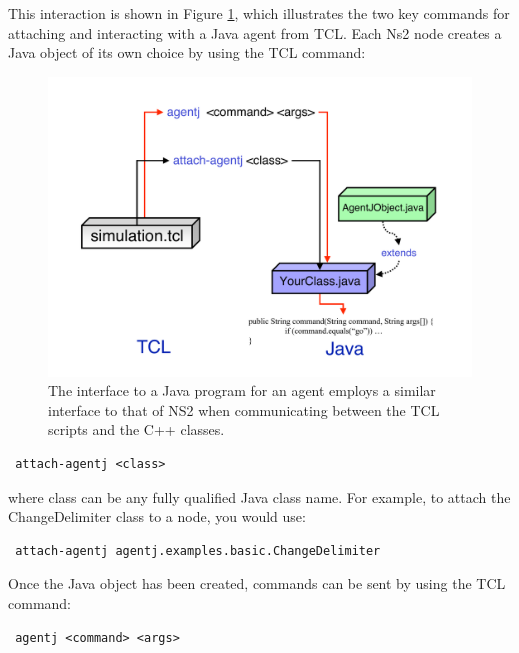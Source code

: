  This interaction is shown in Figure \ref{fig:useroverview}, which illustrates
 the two key commands for attaching and interacting with a Java
 agent from TCL.  Each Ns2 node creates a Java object of its own 
 choice by using the TCL command:

\begin{figure}
 \centering
 \includegraphics[scale=0.4]{images/useroverview}
 \caption{The interface to a Java program for an agent employs
 a similar interface to that of NS2 when communicating between
 the TCL scripts and the C++ classes. }
 \label{fig:useroverview}
 \end{figure}

 \footnotesize
 \begin{verbatim}
 attach-agentj <class>
 \end{verbatim}
 \normalsize

 \noindent where class can be any fully qualified Java class name.  For example, to attach the ChangeDelimiter class to a node, you would use:
 

 \footnotesize
 \begin{verbatim}
 attach-agentj agentj.examples.basic.ChangeDelimiter
 \end{verbatim}
 \normalsize
 

 Once the Java object has been created, commands can be sent by using the TCL command:

 \footnotesize
 \begin{verbatim}
 agentj <command> <args>
 \end{verbatim}
 \normalsize

